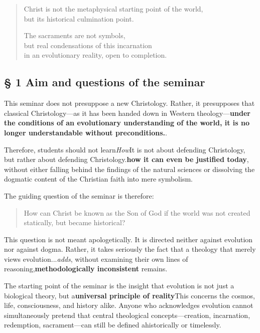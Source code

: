 \documentclass[
]{article}
\begin{document}
\begin{quote}
Christ is not the metaphysical starting point of the world,\\
but its historical culmination point.

The sacraments are not symbols,\\
but real condensations of this incarnation\\
in an evolutionary reality, open to completion.
\end{quote}

\subsection{\texorpdfstring{\textbf{§ 1 Aim and questions of the seminar}}{§ 1 Aim and questions of the seminar}}\label{aim-and-questions-of-the-seminar}

This seminar does not presuppose a new Christology. Rather, it presupposes that classical Christology---as it has been handed down in Western theology---\textbf{under the conditions of an evolutionary understanding of the world, it is no longer understandable without preconditions.}.

Therefore, students should not learn\emph{How}It is not about defending Christology, but rather about defending Christology.\textbf{how it can even be justified today}, without either falling behind the findings of the natural sciences or dissolving the dogmatic content of the Christian faith into mere symbolism.

The guiding question of the seminar is therefore:

\begin{quote}
How can Christ be known as the Son of God if the world was not created statically, but became historical?
\end{quote}

This question is not meant apologetically. It is directed neither against evolution nor against dogma. Rather, it takes seriously the fact that a theology that merely views evolution...\emph{adds}, without examining their own lines of reasoning,\textbf{methodologically inconsistent} remains.

The starting point of the seminar is the insight that evolution is not just a biological theory, but a\textbf{universal principle of reality}This concerns the cosmos, life, consciousness, and history alike. Anyone who acknowledges evolution cannot simultaneously pretend that central theological concepts---creation, incarnation, redemption, sacrament---can still be defined ahistorically or timelessly.
\end{document}
